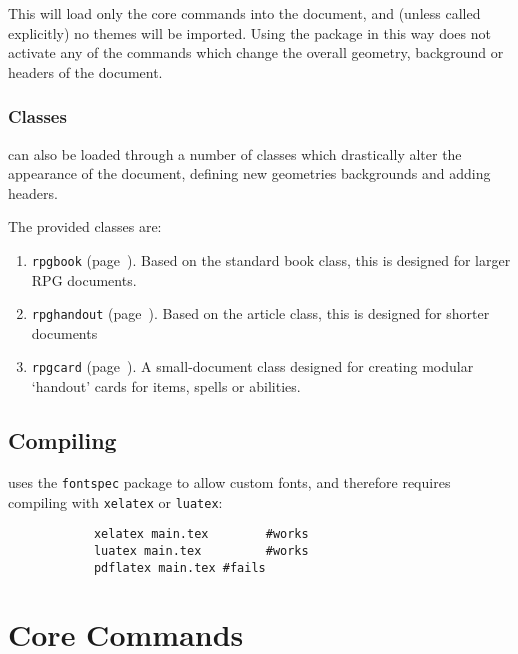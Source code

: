 			This will load only the core commands into the document, and (unless called explicitly) no themes will be imported. Using the package in this way does not activate any of the commands which change the overall geometry, background or headers of the document.

		\subsection{Classes}

			\rpgtex{} can also be loaded through a number of classes which drastically alter the appearance of the document, defining new geometries backgrounds and adding headers.

			The provided classes are:
			\begin{enumerate}
				\item \texttt{rpgbook} (page~\pageref{S:bookClass}). Based on the standard book class, this is designed for larger RPG documents.
				\item \texttt{rpghandout} (page~\pageref{S:handoutClass}). Based on the article class, this is designed for shorter documents
				\item \texttt{rpgcard} (page~\pageref{S:cardClass}). A small-document class designed for creating modular `handout' cards for items, spells or abilities.
			\end{enumerate}
	\section{Compiling}

		\rpgtex{} uses the \texttt{fontspec} package to allow custom fonts, and therefore requires compiling with \texttt{xelatex} or \texttt{luatex}:

		\begin{lstlisting}
			xelatex main.tex		#works
			luatex main.tex			#works
			pdflatex main.tex #fails
		\end{lstlisting}

\onecolumn




\chapter{Core Commands}

	\blindtext{}




